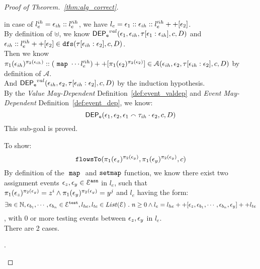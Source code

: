 \begin{proof}[Proof of Theorem.~\ref{thm:alg_correct}]
\begin{case}
\begin{subproof}
in case of $l^{ih}_e =  \mathtt{\epsilon}_{ih}::l'^{ih}_e$, we have
 $l_e = \mathtt{\epsilon}_1::\mathtt{\epsilon}_{ih}::l'^{ih}_e ++ [\mathtt{\epsilon}_2]$.
\\
By definition of $\uplus$, we know $\mathsf{DEP_{\mathtt{e}}}^{val}(\mathtt{\epsilon}_1, \mathtt{\epsilon}_{ih}, \mathtt{\tau}[\mathtt{\epsilon}_1:\mathtt{\epsilon}_{ih}], c, D)$ and 
$\mathtt{\epsilon}_{ih}::l'^{ih}_e ++ [\mathtt{\epsilon}_2] \in \mathtt{dfs}(\mathtt{\tau}[\mathtt{\epsilon}_{ih}:\mathtt{\epsilon}_2], c, D)$.
\\
Then we know $\pi_1(\mathtt{\epsilon}_{ih})^{\pi_2(\mathtt{\epsilon}_{ih})}:: 
(~\mathtt{map}~ \cdots l'^{ih}_e) ++ [\pi_1(\mathtt{\epsilon}_{2})^{\pi_2(\mathtt{\epsilon}_{2})}] \in \mathcal{A}(\mathtt{\epsilon}_{ih}, \mathtt{\epsilon}_2, \mathtt{\tau}[\mathtt{\epsilon}_{ih}:\mathtt{\epsilon}_2], c, D)$ by definition of $\mathcal{A}$.
\\
And $\mathsf{DEP_{\mathtt{e}}}^{val}(\mathtt{\epsilon}_{ih}, \mathtt{\epsilon}_2, \mathtt{\tau}[\mathtt{\epsilon}_{ih}:\mathtt{\epsilon}_2], c, D)$ by the induction hypothesis.
\\
By the \emph{Value May-Dependent} Definition~\ref{def:event_valdep} and \emph{Event May-Dependent} Definition~\ref{def:event_dep}, we know:
\[
  \mathsf{DEP_{\mathtt{e}}}(\mathtt{\epsilon}_1, \mathtt{\epsilon}_2, \mathtt{\epsilon}_1 \smallfrown \mathtt{\tau}_{ih} \cdot \mathtt{\epsilon}_2, {c}, D) 
  \]
This sub-goal is proved.
\end{subproof}
To show:
\[  
\mathtt{flowsTo}(\pi_1(\mathtt{\epsilon}_z)^{\pi_2(\mathtt{\epsilon}_y)}, \pi_1(\mathtt{\epsilon}_y)^{\pi_2(\mathtt{\epsilon}_y)}, c)
\]
By definition of the $~\mathtt{map}~$ and $\mathtt{setmap}$ function, we know there exist 
two assignment events
$\mathtt{\epsilon}_z, \mathtt{\epsilon}_y \in \mathcal{E}^{\mathtt{{asn}}}$ in $l_e$,
such that $ \pi_1(\mathtt{\epsilon}_z)^{\pi_2(\mathtt{\epsilon}_y)} = z^i \land \pi_1(\mathtt{\epsilon}_y)^{\pi_2(\mathtt{\epsilon}_y)} = y^j$
and $l_e$ having the form:
\\
\[
 \exists  n \in \mathbb{N}, \mathtt{\epsilon}_{b_1}, \cdots, \mathtt{\epsilon}_{b_n} \in \mathcal{E}^{\mathtt{{test}}}, l_{he}, l_{te} \in List(\mathcal{E}) ~.~ 
  n \geq 0 \land l_e = l_{he} ++ [\mathtt{\epsilon}_z, \mathtt{\epsilon}_{b_1}, \cdots, \mathtt{\epsilon}_{b_n}, \mathtt{\epsilon}_y] ++ l_{te}
\]
, with $0$ or more testing events between $\mathtt{\epsilon}_z, \mathtt{\epsilon}_y$ in $l_e$.
\\
There are 2 cases.
\begin{subcase}.
%

\end{subcase}
\end{case}
\end{proof}
